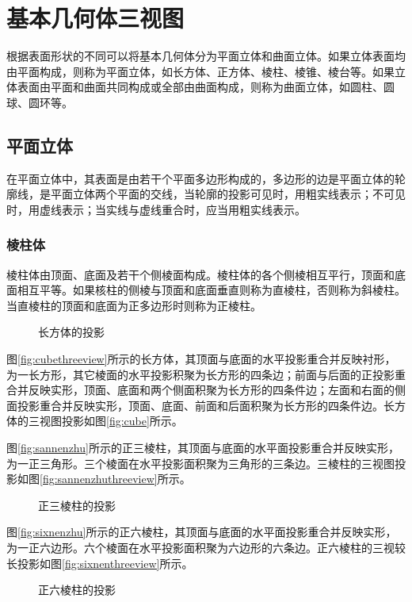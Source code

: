 \section{基本几何体三视图}
根据表面形状的不同可以将基本几何体分为平面立体和曲面立体。如果立体表面均由平面构成，则称为平面立体，如长方体、正方体、棱柱、棱锥、棱台等。如果立体表面由平面和曲面共同构成或全部由曲面构成，则称为曲面立体，如圆柱、圆球、圆环等。
\subsection{平面立体}
在平面立体中，其表面是由若干个平面多边形构成的，多边形的边是平面立体的轮廓线，是平面立体两个平面的交线，当轮廓的投影可见时，用粗实线表示；不可见时，用虚线表示；当实线与虚线重合时，应当用粗实线表示。
\subsubsection{棱柱体}
棱柱体由顶面、底面及若干个侧棱面构成。棱柱体的各个侧棱相互平行，顶面和底面相互平等。如果核柱的侧棱与顶面和底面垂直则称为直棱柱，否则称为斜棱柱。当直棱柱的顶面和底面为正多边形时则称为正棱柱。
\begin{figure}[htbp]
\centering
{}\hspace{30pt}
\caption{长方体的投影}
\end{figure}

图\ref{fig:cubethreeview}所示的长方体，其顶面与底面的水平投影重合并反映衬形，为一长方形，其它棱面的水平投影积聚为长方形的四条边；前面与后面的正投影重合并反映实形，顶面、底面和两个侧面积聚为长方形的四条件边；左面和右面的侧面投影重合并反映实形，顶面、底面、前面和后面积聚为长方形的四条件边。长方体的三视图投影如图\ref{fig:cube}所示。

图\ref{fig:sannenzhu}所示的正三棱柱，其顶面与底面的水平面投影重合并反映实形，为一正三角形。三个棱面在水平投影面积聚为三角形的三条边。三棱柱的三视图投影如图\ref{fig:sannenzhuthreeview}所示。
\begin{figure}[htbp]
\centering
{}\hspace{30pt}
\caption{正三棱柱的投影}
\end{figure}

图\ref{fig:sixnenzhu}所示的正六棱柱，其顶面与底面的水平面投影重合并反映实形，为一正六边形。六个棱面在水平投影面积聚为六边形的六条边。正六棱柱的三视较长投影如图\ref{fig:sixnenthreeview}所示。
\begin{figure}[htbp]
\centering
{}\hspace{30pt}
\caption{正六棱柱的投影}
\end{figure}

